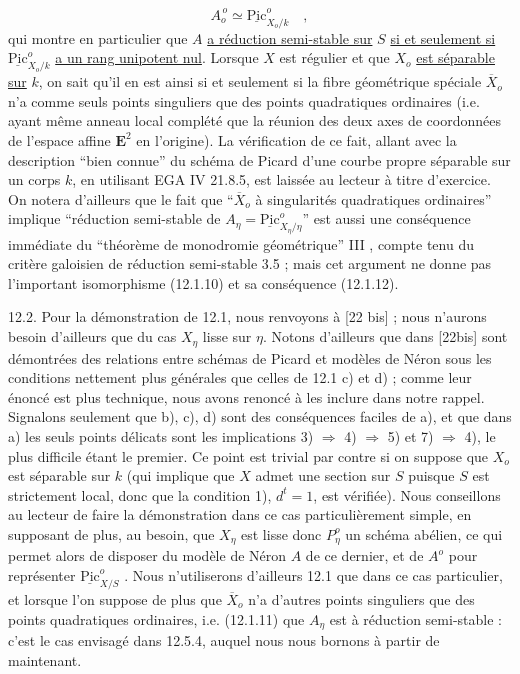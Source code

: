 \begin{equation}\tag{12.1.12}
A_o^{\,o} \simeq \underline{\mathrm{Pic}}^o_{X_o/k} \quad ,
\end{equation}
qui montre en particulier que $A$ \underline{a réduction semi-stable sur} $S$ \underline{si et seulement si} $\underline{\mathrm{Pic}}^o_{X_o/k}$ \underline{a un rang unipotent nul}. Lorsque $X$ est régulier et que $X_o$ \underline{est séparable sur} $k$, on sait qu'il en est ainsi si et seulement si la fibre géométrique spéciale $\overline{X}_o$ n'a comme seuls points singuliers que des points quadratiques ordinaires (i.e. ayant même anneau local complété que la réunion des deux axes de coordonnées de l'espace affine $\mathbf{E}^2$ en l'origine). La vérification de ce fait, allant avec la description ``bien connue'' du schéma de Picard d'une courbe propre séparable sur un corps $k$, en utilisant EGA IV 21.8.5, est laissée au lecteur à titre d'exercice. On notera d'ailleurs que le fait que ``$\overline{X}_o$ à singularités quadratiques ordinaires'' implique ``réduction semi-stable de $A_\eta = \underline{\mathrm{Pic}}^o_{X_\eta/\eta}$'' est aussi une conséquence immédiate du ``théorème de monodromie géométrique'' III \hspace{3.5em} , compte tenu du critère galoisien de réduction semi-stable 3.5 ; mais cet argument ne donne pas l'important isomorphisme (12.1.10) et sa conséquence (12.1.12).



12.2. Pour la démonstration de 12.1, nous renvoyons à [22 bis] ; nous n'aurons besoin d'ailleurs que du cas $X_\eta$ lisse sur $\eta$. Notons d'ailleurs que dans [22bis] sont démontrées des relations entre schémas de Picard et modèles de Néron sous les conditions nettement plus générales que celles de 12.1 c) et d) ; comme leur énoncé est plus technique, nous avons renoncé à les inclure dans notre rappel. Signalons seulement que b), c), d) sont des conséquences faciles de a), et que dans a) les seuls points délicats sont les implications 3) $\Longrightarrow$ 4) $\Longrightarrow$ 5) et 7) $\Longrightarrow$ 4), le plus difficile étant le premier. Ce point est trivial par contre si on suppose que $X_o$ est séparable sur $k$ (qui implique que $X$ admet une section sur $S$ puisque $S$ est strictement local, donc que la condition 1), $d^t=1$, est vérifiée). Nous conseillons au lecteur de faire la démonstration dans ce cas particulièrement simple, en supposant de plus, au besoin, que $X_\eta$ est lisse donc $P^o_\eta$ un schéma abélien, ce qui permet alors de disposer du modèle de Néron $A$ de ce dernier, et de $A^o$ pour représenter $\underline{\mathrm{Pic}}^o_{X/S}$ . Nous n'utiliserons d'ailleurs 12.1 que dans ce cas particulier, et lorsque l'on suppose de plus que $\overline{X}_o$ n'a d'autres points singuliers que des points quadratiques ordinaires, i.e. (12.1.11) que $A_\eta$ est à réduction semi-stable : c'est le cas envisagé dans 12.5.4, auquel nous nous bornons à partir de maintenant.

